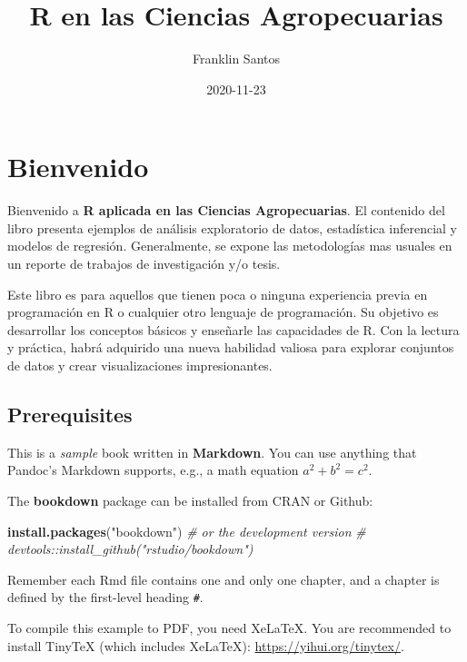 \documentclass[
]{book}
\title{R en las Ciencias Agropecuarias}
\author{Franklin Santos}
\date{2020-11-23}
\newenvironment{Shaded}{\begin{snugshade}}{\end{snugshade}}
\newcommand{\CommentTok}[1]{\textcolor[rgb]{0.56,0.35,0.01}{\textit{#1}}}
\newcommand{\KeywordTok}[1]{\textcolor[rgb]{0.13,0.29,0.53}{\textbf{#1}}}
\newcommand{\NormalTok}[1]{#1}
\newcommand{\StringTok}[1]{\textcolor[rgb]{0.31,0.60,0.02}{#1}}
\begin{document}
\maketitle

{
\setcounter{tocdepth}{1}
\tableofcontents
}
\hypertarget{bienvenido}{%
\chapter*{Bienvenido}\label{bienvenido}}

Bienvenido a \textbf{R aplicada en las Ciencias Agropecuarias}. El contenido del libro presenta ejemplos de análisis exploratorio de datos, estadística inferencial y modelos de regresión. Generalmente, se expone las metodologías mas usuales en un reporte de trabajos de investigación y/o tesis.

Este libro es para aquellos que tienen poca o ninguna experiencia previa en programación en R o cualquier otro lenguaje de programación. Su objetivo es desarrollar los conceptos básicos y enseñarle las capacidades de R. Con la lectura y práctica, habrá adquirido una nueva habilidad valiosa para explorar conjuntos de datos y crear visualizaciones impresionantes.

\hypertarget{prerequisites}{%
\section{Prerequisites}\label{prerequisites}}

This is a \emph{sample} book written in \textbf{Markdown}. You can use anything that Pandoc's Markdown supports, e.g., a math equation \(a^2 + b^2 = c^2\).

The \textbf{bookdown} package can be installed from CRAN or Github:

\begin{Shaded}
\begin{Highlighting}[]
\KeywordTok{install.packages}\NormalTok{(}\StringTok{"bookdown"}\NormalTok{)}
\CommentTok{# or the development version}
\CommentTok{# devtools::install_github("rstudio/bookdown")}
\end{Highlighting}
\end{Shaded}

Remember each Rmd file contains one and only one chapter, and a chapter is defined by the first-level heading \texttt{\#}.

To compile this example to PDF, you need XeLaTeX. You are recommended to install TinyTeX (which includes XeLaTeX): \url{https://yihui.org/tinytex/}.
\end{document}
